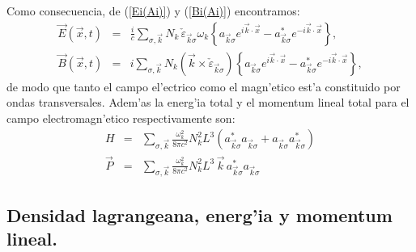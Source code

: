 Como consecuencia, de (\ref{Ei(Ai)}) y (\ref{Bi(Ai)}) encontramos:
\begin{eqnarray}
\vec{E}(\vec{x},t)  & =
&\frac{i}{c}\sum_{\sigma,\vec{k}}N_k\,\check{\varepsilon}_{\vec{k}\sigma}\omega_
{k}\left\{
a_{\vec{k}\sigma}e^{i\vec{k}\cdot\vec{x}}-a_{\vec{k}\sigma}^*e^{-i\vec{k}
\cdot\vec{x}}\right\}, \\
\vec{B}(\vec{x},t) & = &i\sum_{\sigma,\vec{k}}N_k\left(
\vec{k}\times\check{\varepsilon}_{\vec{k}\sigma}\right) \left\{
a_{\vec{k}\sigma}e^{i\vec{k}\cdot\vec{x}}-a_{\vec{k}\sigma}^*e^{-i\vec{k}
\cdot\vec{x}}\right\} ,
\end{eqnarray}
de modo que tanto el campo el'ectrico como el magn'etico est'a constituido por
ondas transversales. Adem'as la energ'ia total y el momentum lineal total para
el campo electromagn'etico respectivamente son:
\begin{eqnarray}
H & = &\sum_{\sigma,\vec{k}}\frac{\omega_{k}^2}{8\pi c^2}N_k^2L^3\left(
a_{\vec{k}\sigma}^* a_{\vec{k}\sigma}+ a_{\vec{k}\sigma}
a_{\vec{k}\sigma}^*\right)  \\
\vec{P} & = &\sum_{\sigma,\vec{k}}\frac{\omega_{k}^2}{8\pi
c^2}N_k^2L^3\,\vec{k}\,a_{\vec{k}\sigma}^* a_{\vec{k}\sigma}
\end{eqnarray}


\subsection{Densidad lagrangeana, energ'ia y momentum lineal.}

